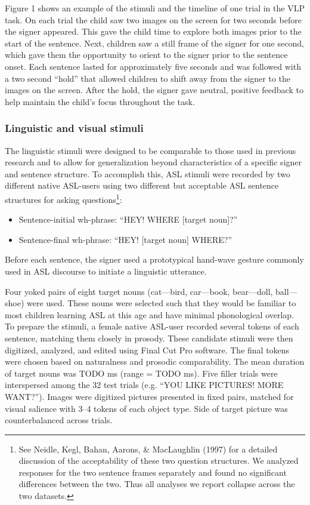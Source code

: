 \documentclass[12pt,]{article}
\let\rmarkdownfootnote\footnote%
\def\footnote{\protect\rmarkdownfootnote}
\begin{document}
Figure 1 shows an example of the stimuli and the timeline of one trial
in the VLP task. On each trial the child saw two images on the screen
for two seconds before the signer appeared. This gave the child time to
explore both images prior to the start of the sentence. Next, children
saw a still frame of the signer for one second, which gave them the
opportunity to orient to the signer prior to the sentence onset. Each
sentence lasted for approximately five seconds and was followed with a
two second ``hold'' that allowed children to shift away from the signer
to the images on the screen. After the hold, the signer gave neutral,
positive feedback to help maintain the child's focus throughout the
task.

\subsubsection{Linguistic and visual
stimuli}\label{linguistic-and-visual-stimuli}

The linguistic stimuli were designed to be comparable to those used in
previous research and to allow for generalization beyond characteristics
of a specific signer and sentence structure. To accomplish this, ASL
stimuli were recorded by two different native ASL-users using two
different but acceptable ASL sentence structures for asking
questions\footnote{See Neidle, Kegl, Bahan, Aarons, \& MacLaughlin
  (1997) for a detailed discussion of the acceptability of these two
  question structures. We analyzed responses for the two sentence frames
  separately and found no significant differences between the two. Thus
  all analyses we report collapse across the two datasets.}:

\begin{itemize}
\itemsep1pt\parskip0pt
\item
  Sentence-initial wh-phrase: ``HEY! WHERE {[}target noun{]}?''
\item
  Sentence-final wh-phrase: ``HEY! {[}target noun{]} WHERE?''
\end{itemize}

Before each sentence, the signer used a prototypical hand-wave gesture
commonly used in ASL discourse to initiate a linguistic utterance.

Four yoked pairs of eight target nouns (cat---bird, car---book,
bear---doll, ball---shoe) were used. These nouns were selected such that
they would be familiar to most children learning ASL at this age and
have minimal phonological overlap. To prepare the stimuli, a female
native ASL-user recorded several tokens of each sentence, matching them
closely in prosody. These candidate stimuli were then digitized,
analyzed, and edited using Final Cut Pro software. The final tokens were
chosen based on naturalness and prosodic comparability. The mean
duration of target nouns was TODO ms (range = TODO ms). Five filler
trials were interspersed among the 32 test trials (e.g. ``YOU LIKE
PICTURES! MORE WANT?''). Images were digitized pictures presented in
fixed pairs, matched for visual salience with 3--4 tokens of each object
type. Side of target picture was counterbalanced across trials.
\end{document}
